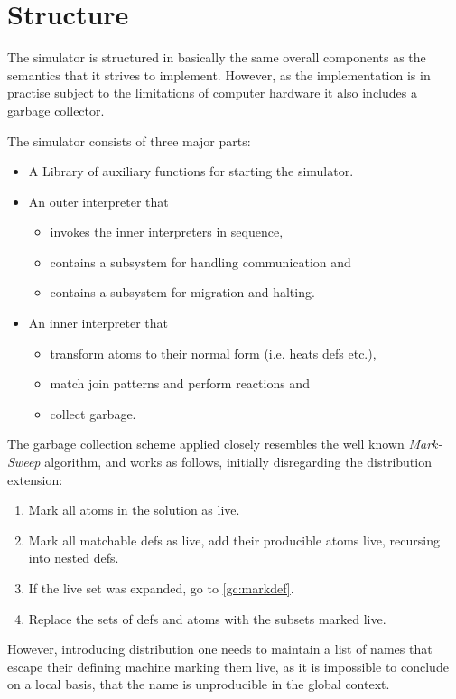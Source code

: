 \section*{Structure}

The simulator is structured in basically the same overall components as the
semantics that it strives to implement. However, as the implementation is in
practise subject to the limitations of computer hardware it also includes a
garbage collector.

The simulator consists of three major parts:
\begin{itemize}
\item A Library of auxiliary functions for starting the simulator.
\item An outer interpreter that
      \begin{itemize}
      \item invokes the inner interpreters in sequence,
      \item contains a subsystem for handling communication and
      \item contains a subsystem for migration and halting.
      \end{itemize}
\item An inner interpreter that
      \begin{itemize}
      \item transform atoms to their normal form (i.e. heats defs etc.),
      \item match join patterns and perform reactions and
      \item collect garbage.
      \end{itemize}
\end{itemize}

The garbage collection scheme applied closely resembles the well known
\emph{Mark-Sweep} algorithm, and works as follows, initially disregarding the
distribution extension:
\begin{enumerate}
\item Mark all atoms in the solution as live.
\item Mark all matchable defs as live, add their producible atoms live,
recursing into nested defs.\label{gc:markdef}
\item If the live set was expanded, go to \ref{gc:markdef}.
\item Replace the sets of defs and atoms with the subsets marked live.
\end{enumerate}

However, introducing distribution one needs to maintain a list of names that
escape their defining machine marking them live, as it is impossible to
conclude on a local basis, that the name is unproducible in the global context.


